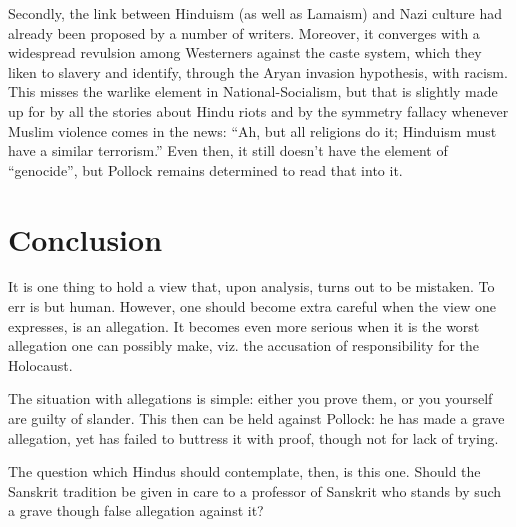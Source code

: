 Secondly, the link between Hinduism (as well as Lamaism) and Nazi culture had already been proposed by a number of writers. Moreover, it converges with a widespread revulsion among Westerners against the caste system, which they liken to slavery and identify, through the Aryan invasion hypothesis, with racism. This misses the warlike element in National-Socialism, but that is slightly made up for by all the stories about Hindu riots and by the symmetry fallacy whenever Muslim violence comes in the news: “Ah, but all religions do it; Hinduism must have a similar terrorism.” Even then, it still doesn’t have the element of “genocide”, but Pollock remains determined to read that into it.

\section*{Conclusion}

It is one thing to hold a view that, upon analysis, turns out to be mistaken. To err is but human. However, one should become extra careful when the view one expresses, is an allegation. It becomes even more serious when it is the worst allegation one can possibly make, viz. the accusation of responsibility for the Holocaust.

The situation with allegations is simple: either you prove them, or you yourself are guilty of slander. This then can be held against Pollock: he has made a grave allegation, yet has failed to buttress it with proof, though not for lack of trying.

The question which Hindus should contemplate, then, is this one. Should the Sanskrit tradition be given in care to a professor of Sanskrit who stands by such a grave though false allegation against it?

\newpage

